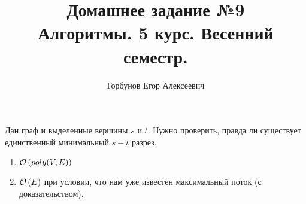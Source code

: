 

\title{Домашнее задание №9 \\ Алгоритмы. 5 курс. Весенний семестр.}
\author{Горбунов Егор Алексеевич}


\maketitle
\begin{task}[1]
Дан граф и выделенные вершины $s$ и $t$. Нужно проверить, правда ли существует единственный минимальный $s-t$ разрез.
\begin{enumerate}
	\item $\mathcal{O}\left(poly(V, E)\right)$
	\item $\mathcal{O}\left(E\right)$ при условии, что нам уже известен максимальный поток (с доказательством).
\end{enumerate}
\end{task}
